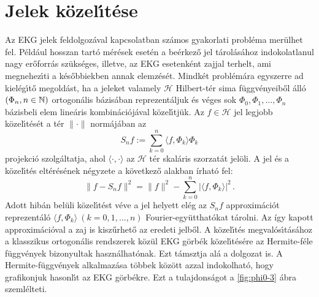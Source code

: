 \documentclass[oneside,titlepage,12pt,a4paper]{report}
\begin{document}
\section{Jelek k\"ozel\'\i t\'ese}	
Az EKG jelek feldolgoz\'aval kapcsolatban sz\'amos gyakorlati probl\'ema mer\"ulhet fel. P\'eld\'aul  hosszan tart\'o  m\'er\'esek eset\'en  a be\'erkez\H o jel t\'arol\'as\'ahoz indokolatlanul nagy er\H oforr\'as sz\"uks\'eges, illetve, az EKG esetenk\'ent zajjal terhelt, ami megnehez\'\i ti a k\'es\H obbiekben annak elemz\'es\'et. Mindk\'et probl\'em\'ara egyszerre ad kiel\'eg\'\i t\H o megold\'ast, ha a jeleket  valamely $\mathcal H$ Hilbert-t\'er  sima f\"uggv\'enyeib\H ol \'all\'o $(\Phi_n, n\in\Bbb N)$ ortogon\'alis b\'azis\'aban reprezent\'aljuk \'es v\'eges sok $\Phi_0,\Phi_1,\ldots,\Phi_n$ b\'azisbeli elem line\'aris kombin\'aci\'oj\'aval k\"ozel\'\i tj\"uk. Az $f\in\mathcal H$ jel
legjobb k\"ozel\'\i t\'es\'et a t\'er $\|\cdot\|$ norm\'aj\'aban az
\begin{equation*}
S_nf:=\sum_{k=0}^n\langle f,\Phi_k\rangle \Phi_k
\end{equation*}
projekci\'o szolg\'altatja, ahol $\langle\cdot,\cdot\rangle$ az $\mathcal  H$ t\'er
skal\'aris szorzat\'at jel\"oli. A jel \'es a k\"ozel\'\i t\'es elt\'er\'es\'enek n\'egyzete  a következő alakban írható fel:
\begin{equation*}
\|f-S_nf\|^2=\|f\|^2-\sum_{k=0}^n|\langle f,\Phi_k\rangle|^2 \,.
\end{equation*}
Adott hib\'an bel\"uli k\"ozel\'\i t\'est v\'eve a jel helyett  el\'eg az
$S_nf$ approxim\'aci\'ot reprezent\'al\'o  $\langle f,\Phi_k\rangle\ (k=0,1,\ldots, n)$ Fourier-egy\"utthat\'okat t\'arolni.  Az így kapott approximációval a zaj is kiszűrhető az eredeti jelből.  A k\"ozel\'\i t\'es megval\'os\'\i t\'as\'ahoz a klasszikus ortogon\'alis rendszerek k\"oz\"ul  EKG g\"orb\'ek k\"ozel\'\i t\'es\'ere  az Hermite-f\'ele f\"uggv\'enyek bizonyultak haszn\'alhat\'onak. Ezt t\'amsztja al\'a a \cite{hexp3} dolgozat is. A Hermite-f\"uggv\'enyek alkalmaz\'asa többek között azzal indokolhat\'o, hogy grafikonjuk hasonl\'\i t az EKG g\"orb\'ekre. Ezt a tulajdonságot a \ref{fig:phi0-3} ábra szemlélteti.
\end{document}
